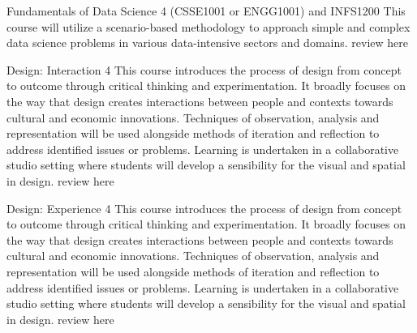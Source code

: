 	{Fundamentals of Data Science}
	{4}
	{(CSSE1001 or ENGG1001) and INFS1200}
	{}
	{}
	{This course will utilize a scenario-based methodology to approach simple and complex data science problems in various data-intensive sectors and domains.}
	{review here}

	{Design: Interaction}
	{4}
	{}
	{}
	{}
	{This course introduces the process of design from concept to outcome through critical thinking and experimentation. It broadly focuses on the way that design creates interactions between people and contexts towards cultural and economic innovations. Techniques of observation, analysis and representation will be used alongside methods of iteration and reflection to address identified issues or problems. Learning is undertaken in a collaborative studio setting where students will develop a sensibility for the visual and spatial in design.}
	{review here}

	{Design: Experience}
	{4}
	{}
	{}
	{}
	{This course introduces the process of design from concept to outcome through critical thinking and experimentation. It broadly focuses on the way that design creates interactions between people and contexts towards cultural and economic innovations. Techniques of observation, analysis and representation will be used alongside methods of iteration and reflection to address identified issues or problems. Learning is undertaken in a collaborative studio setting where students will develop a sensibility for the visual and spatial in design.}
	{review here}

